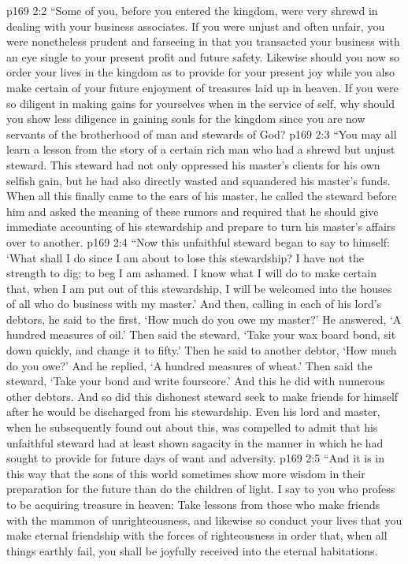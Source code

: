 \vs p169 2:2 \pc \textcolor{ubdarkred}{“Some of you, before you entered the kingdom, were very shrewd in dealing with your business associates. If you were unjust and often unfair, you were nonetheless prudent and farseeing in that you transacted your business with an eye single to your present profit and future safety. Likewise should you now so order your lives in the kingdom as to provide for your present joy while you also make certain of your future enjoyment of treasures laid up in heaven. If you were so diligent in making gains for yourselves when in the service of self, why should you show less diligence in gaining souls for the kingdom since you are now servants of the brotherhood of man and stewards of God?}
\vs p169 2:3 \textcolor{ubdarkred}{“You may all learn a lesson from the story of a certain rich man who had a shrewd but unjust steward. This steward had not only oppressed his master’s clients for his own selfish gain, but he had also directly wasted and squandered his master’s funds. When all this finally came to the ears of his master, he called the steward before him and asked the meaning of these rumors and required that he should give immediate accounting of his stewardship and prepare to turn his master’s affairs over to another.}
\vs p169 2:4 \textcolor{ubdarkred}{“Now this unfaithful steward began to say to himself: ‘What shall I do since I am about to lose this stewardship? I have not the strength to dig; to beg I am ashamed. I know what I will do to make certain that, when I am put out of this stewardship, I will be welcomed into the houses of all who do business with my master.’ And then, calling in each of his lord’s debtors, he said to the first, ‘How much do you owe my master?’ He answered, ‘A hundred measures of oil.’ Then said the steward, ‘Take your wax board bond, sit down quickly, and change it to fifty.’ Then he said to another debtor, ‘How much do you owe?’ And he replied, ‘A hundred measures of wheat.’ Then said the steward, ‘Take your bond and write fourscore.’ And this he did with numerous other debtors. And so did this dishonest steward seek to make friends for himself after he would be discharged from his stewardship. Even his lord and master, when he subsequently found out about this, was compelled to admit that his unfaithful steward had at least shown sagacity in the manner in which he had sought to provide for future days of want and adversity.}
\vs p169 2:5 \textcolor{ubdarkred}{“And it is in this way that the sons of this world sometimes show more wisdom in their preparation for the future than do the children of light. I say to you who profess to be acquiring treasure in heaven: Take lessons from those who make friends with the mammon of unrighteousness, and likewise so conduct your lives that you make eternal friendship with the forces of righteousness in order that, when all things earthly fail, you shall be joyfully received into the eternal habitations.}
